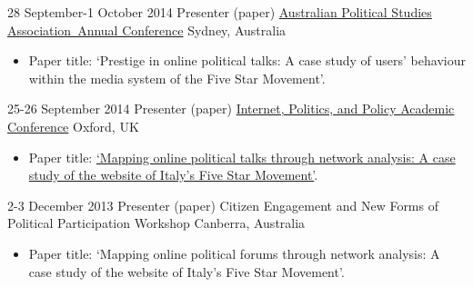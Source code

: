 \documentclass[11pt,a4paper,sans]{moderncv}
\begin{document}
    \cventry
        {28 September-1 October 2014} %
    {Presenter (paper)} %
    {\href{https://sites.google.com/site/apsa2014/home}{Australian Political Studies Association Annual Conference}} %
    {Sydney, Australia} %
{}
    {
      \begin{itemize} %
        \item {Paper title: `Prestige in online political talks: A case study of users' behaviour within the media system of the Five Star Movement'.}
      \end{itemize}
    }

    \cventry
        {25-26 September 2014} %
    {Presenter (paper)} %
    {\href{http://ipp.oii.ox.ac.uk/2014}{Internet, Politics, and Policy Academic Conference}} %
    {Oxford, UK} %
{}
    {
      \begin{itemize} %
        \item {Paper title: \href{http://ipp.oii.ox.ac.uk/2014/programme-2014/track-d-networked-politics/political-and-personal-networks/francesco-bailo-mapping-online-political}{`Mapping online political talks through network analysis: A case study of the website of Italy's Five Star Movement'}.}
      \end{itemize}
    }

    \cventry
     {2-3 December 2013} %
    {Presenter (paper)} %
    {Citizen Engagement and New Forms of Political Participation Workshop} %
    {Canberra, Australia} %
    {}
    {
      \begin{itemize} %
        \item {Paper title: `Mapping online political forums through network analysis: A case study of the website of Italy's Five Star Movement'.}
      \end{itemize}
    }

      
    

    
\end{document}
